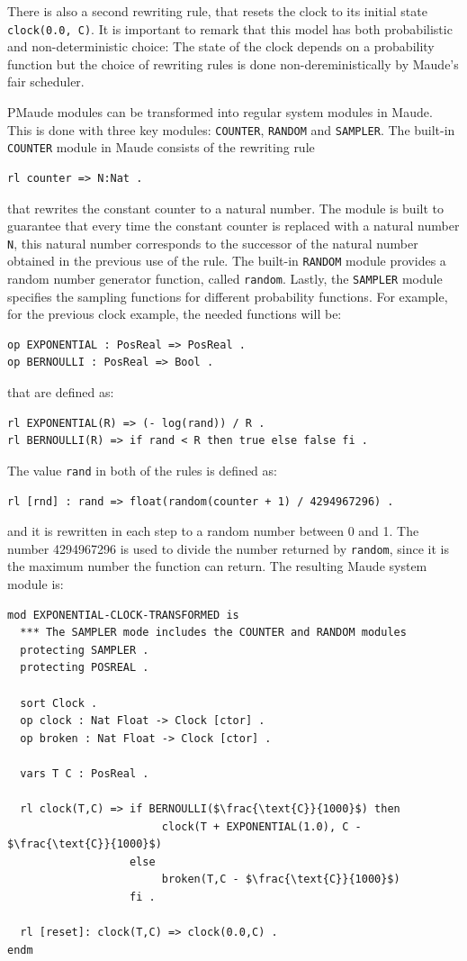 There is also a second rewriting rule, that resets the clock to its initial state \texttt{clock(0.0, C)}. It is important to remark that this model has both probabilistic and non-deterministic choice: The state of the clock depends on a probability function but the choice of rewriting rules is done non-dereministically by Maude's fair scheduler.

PMaude modules can be transformed into regular system modules in Maude. This is done with three key modules: \texttt{COUNTER}, \texttt{RANDOM} and \texttt{SAMPLER}. The built-in \texttt{COUNTER} module in Maude consists of the rewriting rule
\begin{lstlisting}
rl counter => N:Nat .
\end{lstlisting}
that rewrites the constant counter to a natural number. The module is built to guarantee that every time the constant counter is replaced with a natural number \texttt{N}, this natural number corresponds to the successor of the natural number obtained in the previous use of the rule. The built-in \texttt{RANDOM} module provides a random number generator function, called \texttt{random}. Lastly, the \texttt{SAMPLER} module specifies the sampling functions for different probability functions. For example, for the previous clock example, the needed functions will be:
\begin{lstlisting}
op EXPONENTIAL : PosReal => PosReal .
op BERNOULLI : PosReal => Bool .
\end{lstlisting}
that are defined as:
\begin{lstlisting}
rl EXPONENTIAL(R) => (- log(rand)) / R .
rl BERNOULLI(R) => if rand < R then true else false fi .
\end{lstlisting}
The value \texttt{rand} in both of the rules is defined as:
\begin{lstlisting}
rl [rnd] : rand => float(random(counter + 1) / 4294967296) .
\end{lstlisting}
and it is rewritten in each step to a random number between 0 and 1. The number 4294967296 is used to divide the number returned by \texttt{random}, since it is the maximum number the function can return. The resulting Maude system module \cite{Agha2006} is:
\begin{lstlisting}[mathescape=true]
mod EXPONENTIAL-CLOCK-TRANSFORMED is 
  *** The SAMPLER mode includes the COUNTER and RANDOM modules
  protecting SAMPLER .
  protecting POSREAL .
  
  sort Clock . 
  op clock : Nat Float -> Clock [ctor] . 
  op broken : Nat Float -> Clock [ctor] . 
  
  vars T C : PosReal . 
  
  rl clock(T,C) => if BERNOULLI($\frac{\text{C}}{1000}$) then 
                        clock(T + EXPONENTIAL(1.0), C - $\frac{\text{C}}{1000}$) 
                   else 
                        broken(T,C - $\frac{\text{C}}{1000}$)
                   fi .
  
  rl [reset]: clock(T,C) => clock(0.0,C) .
endm
\end{lstlisting}

